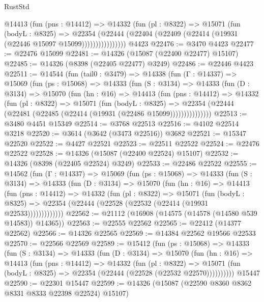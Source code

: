 \begin{lexlean}{RustStd}
\begin{coremodule}
                @14413
                  (fun (pns : @14412) =>
                  @14332
                    (fun (pl : @8322) =>
                    @15071
                      (fun (bodyL : @8325) =>
                      @22354
                        (@22444
                          (@22404 (@22409 (@22414 (@19931 (@22446 @15097 @15099))))))))))))))))
    @4423
@22476 := @3470 @4423
@22477 := @22476 @15099
@22481 := @14326 (@15087 (@22400 @22477) @15107)
@22485 := @14326 (@8398 (@22405 @22477) @3249)
@22486 := @22446 @4423
@22511 := @14544
    (fun (tail0 : @3479) =>
    @14338
      (fun (Γ : @14337) =>
      @15069
        (fun (ps : @15068) =>
        @14333
          (fun (S : @3134) =>
          @14333
            (fun (D : @3134) =>
            @15070
              (fun (hn : @16) =>
              @14413
                (fun (pns : @14412) =>
                @14332
                  (fun (pl : @8322) =>
                  @15071
                    (fun (bodyL : @8325) =>
                    @22354 (@22444 (@22481 (@22485 (@22414 (@19931 (@22486 @15099)))))))))))))))
@22513 := @3480 @4451 @15349
@22514 := @3768 @22513
@22516 := @4102 @22514 @3218
@22520 := @3614 (@3642 (@3473 @22516)) @3682
@22521 := @15347 @22520
@22522 := @4427 @22521
@22523 := @22511 @22522
@22524 := @22476 @22522
@22528 := @14326 (@15087 (@22400 @22524) @15107)
@22532 := @14326 (@8398 (@22405 @22524) @3249)
@22533 := @22486 @22522
@22555 := @14562
    (fun (Γ : @14337) =>
    @15069
      (fun (ps : @15068) =>
      @14333
        (fun (S : @3134) =>
        @14333
          (fun (D : @3134) =>
          @15070
            (fun (hn : @16) =>
            @14413
              (fun (pns : @14412) =>
              @14332
                (fun (pl : @8322) =>
                @15071
                  (fun (bodyL : @8325) =>
                  @22354 (@22444 (@22528 (@22532 (@22414 (@19931 @22533)))))))))))))
@22562 := @21112 (@16908 (@14575 (@14578 (@14580 @539 @14583)) @14365))
@22563 := @22555 @22562
@22565 := @22412 (@14377 @22562)
@22566 := @14326 @22565
@22569 := @14384 @22562 @19566 @22533
@22570 := @22566 @22569
@22589 := @15412
    (fun (ps : @15068) =>
    @14333
      (fun (S : @3134) =>
      @14333
        (fun (D : @3134) =>
        @15070
          (fun (hn : @16) =>
          @14413
            (fun (pns : @14412) =>
            @14332
              (fun (pl : @8322) =>
              @15071 (fun (bodyL : @8325) => @22354 (@22444 (@22528 (@22532 @22570))))))))))
    @15447
@22590 := @22301 @15447
@22599 := @14326 (@15087 (@22590 @8360 @8362 @8331 @8333 @22398 @22524) @15107)

\end{coremodule}
\end{lexlean}
